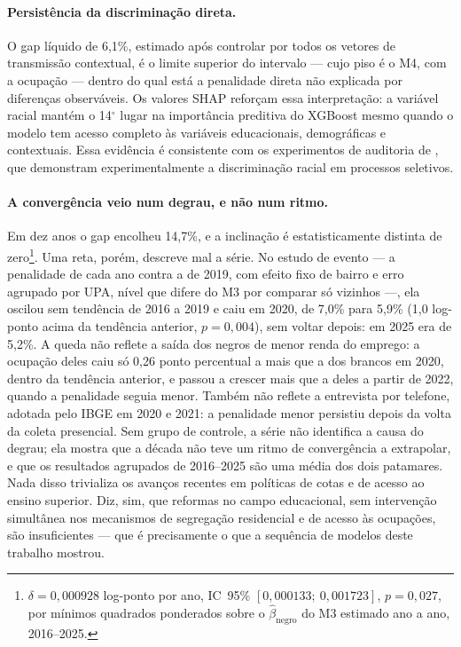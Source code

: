 \documentclass[12pt, a4paper, oneside]{article}
\begin{document}
\paragraph{Persistência da discriminação direta.}
O gap líquido de 6,1\%, estimado após controlar por todos os vetores
de transmissão contextual, é o limite superior do intervalo --- cujo piso é o
M4, com a ocupação --- dentro do qual está a penalidade direta não explicada por
diferenças observáveis. Os valores SHAP reforçam essa
interpretação: a variável racial mantém o 14$^\circ$ lugar
na importância preditiva do XGBoost mesmo quando o modelo tem acesso
completo às variáveis educacionais, demográficas e contextuais.
Essa evidência é consistente com os experimentos de auditoria de
, que demonstram experimentalmente a discriminação
racial em processos seletivos.

\paragraph{A convergência veio num degrau, e não num ritmo.}
Em dez anos o gap encolheu 14{,}7\%, e a inclinação é estatisticamente distinta de zero\footnote{$\delta = 0{,}000928$ log-ponto por ano, IC~95\% $[0{,}000133;\ 0{,}001723]$, $p = 0{,}027$, por mínimos quadrados ponderados sobre o $\hat\beta_{\text{negro}}$ do M3 estimado ano a ano, 2016--2025.}. Uma reta, porém, descreve mal a série. No estudo de evento --- a penalidade de cada ano contra a de 2019, com efeito fixo de bairro e erro agrupado por UPA, nível que difere do M3 por comparar só vizinhos ---, ela oscilou sem tendência de 2016 a 2019 e caiu em 2020, de 7{,}0\% para 5{,}9\% (1{,}0 log-ponto acima da tendência anterior, $p = 0{,}004$), sem voltar depois: em 2025 era de 5{,}2\%. A queda não reflete a saída dos negros de menor renda do emprego: a ocupação deles caiu só 0{,}26 ponto percentual a mais que a dos brancos em 2020, dentro da tendência anterior, e passou a crescer mais que a deles a partir de 2022, quando a penalidade seguia menor. Também não reflete a entrevista por telefone, adotada pelo IBGE em 2020 e 2021: a penalidade menor persistiu depois da volta da coleta presencial. Sem grupo de controle, a série não identifica a causa do degrau; ela mostra que a década não teve um ritmo de convergência a extrapolar, e que os resultados agrupados de 2016--2025 são uma média dos dois patamares. Nada disso trivializa os avanços recentes em políticas de cotas e de acesso ao ensino superior. Diz, sim, que reformas no campo educacional, sem intervenção simultânea nos mecanismos de segregação residencial e de acesso às ocupações, são insuficientes --- que é precisamente o que a sequência de modelos deste trabalho mostrou.
\end{document}
